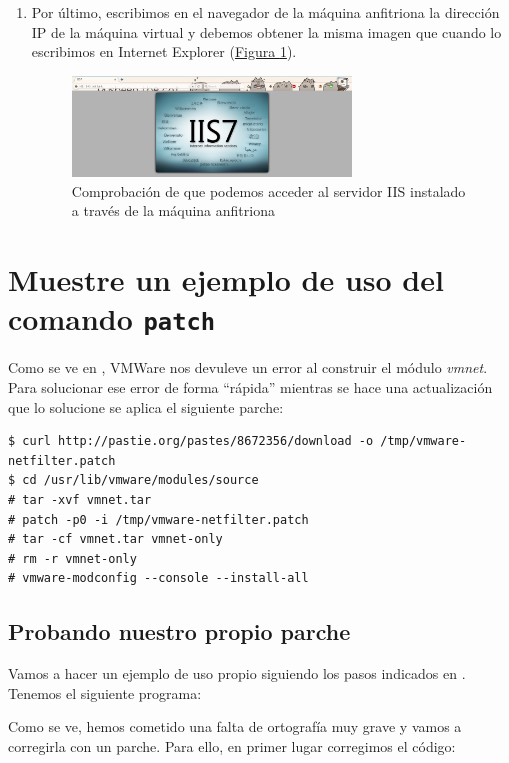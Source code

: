 \documentclass[10pt,a4paper,spanish]{article}
\numberwithin{equation}{section} %
\numberwithin{figure}{section} %
\numberwithin{table}{section} %
\begin{document}
\begin{enumerate}[1.]
    \item Por último, escribimos en el navegador de la máquina anfitriona la dirección IP de la máquina virtual y debemos obtener la misma imagen que cuando lo escribimos en Internet Explorer (\hyperref[yay]{Figura \ref*{yay}}).
    \begin{figure}
        \centering
        \includegraphics[width=0.7\textwidth]{22}
        \caption{Comprobación de que podemos acceder al servidor IIS instalado a través de la máquina anfitriona}
        \label{yay}
    \end{figure}
\end{enumerate}

\section{Muestre un ejemplo de uso del comando \texttt{patch}}
\label{parchefedora}
Como se ve en \cite{patchfed}, VMWare nos devuleve un error al construir el módulo \textit{vmnet}. Para solucionar ese error de forma ``rápida'' mientras se hace una actualización que lo solucione se aplica el siguiente parche:


\begin{verbatim}
$ curl http://pastie.org/pastes/8672356/download -o /tmp/vmware-netfilter.patch
$ cd /usr/lib/vmware/modules/source
# tar -xvf vmnet.tar
# patch -p0 -i /tmp/vmware-netfilter.patch
# tar -cf vmnet.tar vmnet-only
# rm -r vmnet-only
# vmware-modconfig --console --install-all    
\end{verbatim}

\subsection{Probando nuestro propio parche}
Vamos a hacer un ejemplo de uso propio siguiendo los pasos indicados en \cite{examplepatch}. Tenemos el siguiente programa:


Como se ve, hemos cometido una falta de ortografía muy grave y vamos a corregirla con un parche. Para ello, en primer lugar corregimos el código: 
\end{document}
